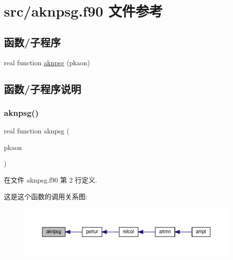\hypertarget{aknpsg_8f90}{}\section{src/aknpsg.f90 文件参考}
\label{aknpsg_8f90}
\subsection*{函数/子程序}
\begin{DoxyCompactItemize}
\item 
real function \mbox{\hyperlink{aknpsg_8f90_a868900aa5bc69c8f43752f48c9601cba}{aknpsg}} (pkaon)
\end{DoxyCompactItemize}


\subsection{函数/子程序说明}
\mbox{\label{aknpsg_8f90_a868900aa5bc69c8f43752f48c9601cba}} 
\subsubsection{\texorpdfstring{aknpsg()}{aknpsg()}}
{\footnotesize\ttfamily real function aknpsg (\begin{DoxyParamCaption}\item[{}]{pkaon }\end{DoxyParamCaption})}



在文件 aknpsg.\+f90 第 2 行定义.

这是这个函数的调用关系图\+:
\nopagebreak
\begin{figure}[H]
\begin{center}
\leavevmode
\includegraphics[width=350pt]{aknpsg_8f90_a868900aa5bc69c8f43752f48c9601cba_icgraph}
\end{center}
\end{figure}
